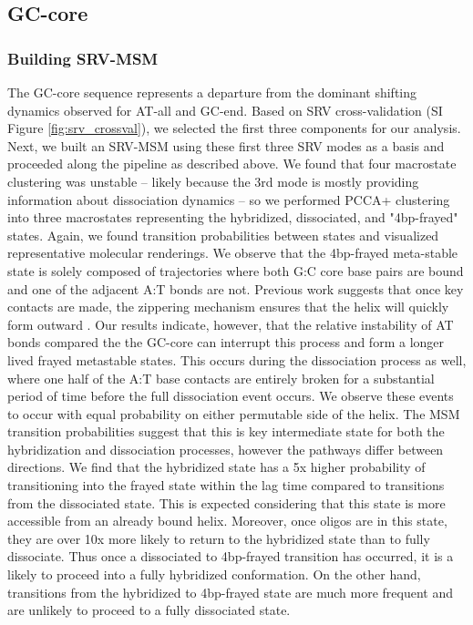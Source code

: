 \documentclass[journal=jpcbfk,manuscript=article]{achemso}
\begin{document}

\subsection{GC-core}

\subsubsection{Building SRV-MSM}

The GC-core sequence represents a departure from the dominant shifting dynamics observed for AT-all and GC-end. Based on SRV cross-validation (SI Figure \ref{fig:srv_crossval}), we selected the first three components for our analysis. Next, we built an SRV-MSM using these first three SRV modes as a basis and proceeded along the pipeline as described above. We found that four macrostate clustering was unstable -- likely because the 3rd mode is mostly providing  information about dissociation dynamics -- so we performed PCCA+ clustering into three macrostates representing the hybridized, dissociated, and "4bp-frayed" states. Again, we found transition probabilities between states and visualized representative molecular renderings. We observe that the 4bp-frayed meta-stable state is solely composed of trajectories where both G:C core base pairs are bound and one of the adjacent A:T bonds are not. Previous work suggests that once key contacts are made, the zippering mechanism ensures that the helix will quickly form outward \citep{Romano2013DNADependence, Yin2011KineticsHybridization}. Our results indicate, however, that the relative instability of AT bonds compared the the GC-core can interrupt this process and form a longer lived frayed metastable states. This occurs during the dissociation process as well, where one half of the A:T base contacts are entirely broken for a substantial period of time before the full dissociation event occurs. We observe these events to occur with equal probability on either permutable side of the helix. The MSM transition probabilities suggest that this is key intermediate state for both the hybridization and dissociation processes, however the pathways differ between directions. We find that the hybridized state has a 5x higher probability of transitioning into the frayed state within the lag time compared to transitions from the dissociated state. This is expected considering that this state is more accessible from an already bound helix. Moreover, once oligos are in this state, they are over 10x more likely to return to the hybridized state than to fully dissociate. Thus once a dissociated to 4bp-frayed transition has occurred, it is a likely to proceed into a fully hybridized conformation. On the other hand, transitions from the hybridized to 4bp-frayed state are much more frequent and are unlikely to proceed to a fully dissociated state.
\end{document}

